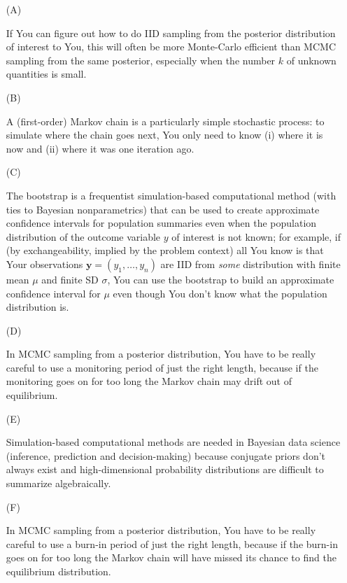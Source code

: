 \documentclass[12pt]{article}
\begin{document}
\begin{itemize}

\item[(A)]

If You can figure out how to do IID sampling from the posterior distribution of interest to You, this will often be more Monte-Carlo efficient than MCMC sampling from the same posterior, especially when the number $k$ of unknown quantities is small.

\item[(B)]

A (first-order) Markov chain is a particularly simple stochastic process: to simulate where the chain goes next, You only need to know (i) where it is now and (ii) where it was one iteration ago.

\item[(C)]

The bootstrap is a frequentist simulation-based computational method (with ties to Bayesian nonparametrics) that can be used to create approximate confidence intervals for population summaries even when the population distribution of the outcome variable $y$ of interest is not known; for example, if (by exchangeability, implied by the problem context) all You know is that Your observations $\bm{ y } = ( y_1, \dots, y_n )$ are IID from \textit{some} distribution with finite mean $\mu$ and finite SD $\sigma$, You can use the bootstrap to build an approximate confidence interval for $\mu$ even though You don't know what the population distribution is.

\item[(D)]

In MCMC sampling from a posterior distribution, You have to be really careful to use a monitoring period of just the right length, because if the monitoring goes on for too long the Markov chain may drift out of equilibrium.

\item[(E)]

Simulation-based computational methods are needed in Bayesian data science (inference, prediction and decision-making) because conjugate priors don't always exist and high-dimensional probability distributions are difficult to summarize algebraically.

\item[(F)]

In MCMC sampling from a posterior distribution, You have to be really careful to use a burn-in period of just the right length, because if the burn-in goes on for too long the Markov chain will have missed its chance to find the equilibrium distribution.


\end{itemize}
\end{document}
